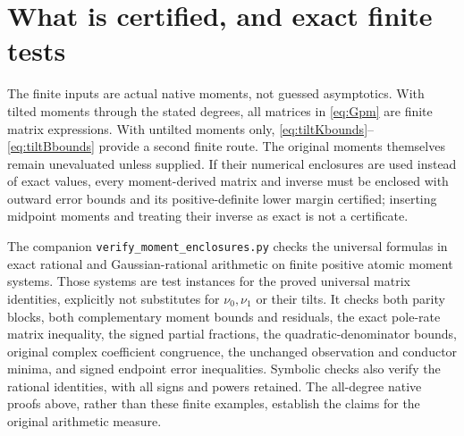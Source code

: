 \documentclass[11pt]{article}
\begin{document}
\section{What is certified, and exact finite tests}

The finite inputs are actual native moments, not guessed asymptotics.
With tilted moments through the stated degrees, all matrices in
\eqref{eq:Gpm} are finite matrix expressions.  With untilted moments
only, \eqref{eq:tiltKbounds}--\eqref{eq:tiltBbounds} provide a second
finite route.  The original moments themselves remain unevaluated
unless supplied.  If their numerical enclosures are used instead of
exact values, every moment-derived matrix and inverse must be enclosed
with outward error bounds and its positive-definite lower margin
certified; inserting midpoint moments and treating their inverse as
exact is not a certificate.

The companion \texttt{verify\_moment\_enclosures.py} checks the
universal formulas in exact rational and Gaussian-rational arithmetic
on finite positive atomic moment systems.  Those systems are test
instances for the proved universal matrix identities, explicitly not
substitutes for $\nu_0,\nu_1$ or their tilts.  It checks both parity
blocks, both complementary moment bounds and residuals, the exact
pole-rate matrix inequality, the signed partial fractions, the
quadratic-denominator bounds, original complex coefficient congruence,
the unchanged observation and conductor minima, and signed endpoint
error inequalities.  Symbolic checks also verify the rational
identities, with all signs and powers retained.  The all-degree native
proofs above, rather than these finite examples, establish the claims
for the original arithmetic measure.
\end{document}
